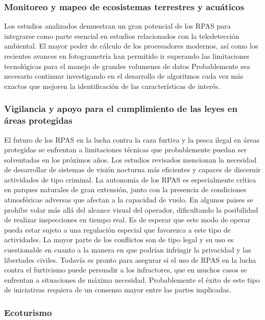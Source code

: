 \documentclass[onecolumn]{extarticle}
\begin{document}
\subsubsection{Monitoreo y mapeo de ecosistemas terrestres y
acuáticos}\label{monitoreo-y-mapeo-de-ecosistemas-terrestres-y-acuaticos-1}

Los estudios analizados demuestran un gran potencial de los RPAS para
integrarse como parte esencial en estudios relacionados con la
teledetección ambiental. El mayor poder de cálculo de los procesadores
modernos, así como los recientes avances en fotogrametría han permitido
ir superando las limitaciones tecnológicas para el manejo de grandes
volumenes de datos Probablemente sea necesario continuar investigando en
el desarrollo de algoritmos cada vez más exactos que mejoren la
identificación de las características de interés.

\subsubsection{Vigilancia y apoyo para el cumplimiento de las leyes en
áreas
protegidas}\label{vigilancia-y-apoyo-para-el-cumplimiento-de-las-leyes-en-areas-protegidas-1}

El futuro de los RPAS en la lucha contra la caza furtiva y la pesca
ilegal en áreas protegidas se enfrentan a limitaciones técnicas que
probablemente puedan ser solventadas en los próximos años. Los estudios
revisados mencionan la necesidad de desarrollar de sistemas de visión
nocturna más eficientes y capaces de discernir actividades de tipo
criminal. La autonomía de los RPAS es especialmente crítica en parques
naturales de gran extensión, junto con la presencia de condiciones
atmosféricas adversas que afectan a la capacidad de vuelo. En algunos
paises se prohibe volar más allá del alcance visual del operador,
dificultando la posibilidad de realizar inspecciones en tiempo real. Es
de esperar que este modo de operar pueda estar sujeto a una regulación
especial que favorezca a este tipo de actividades. La mayor parte de los
conflictos son de tipo legal y su uso es cuestionable en cuanto a la
manera en que podrían infringir la privacidad y las libertades civiles.
Todavía es pronto para asegurar si el uso de RPAS en la lucha contra el
furtivismo puede persuadir a los infractores, que en muchos casos se
enfrentan a situaciones de máxima necesidad. Probablemente el éxito de
este tipo de iniciativas requiera de un consenso mayor entre las partes
implicadas.

\subsubsection{Ecoturismo}\label{ecoturismo-1}
\end{document}
